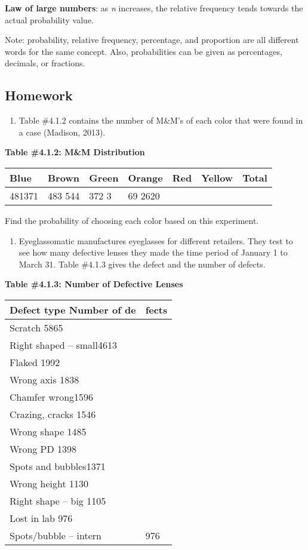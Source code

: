 \documentclass[]{book}
\providecommand{\tightlist}{%
  \setlength{\itemsep}{0pt}\setlength{\parskip}{0pt}}
\begin{document}
\textbf{Law of large numbers}: as \emph{n} increases, the relative frequency tends
towards the actual probability value.

Note: probability, relative frequency, percentage, and proportion are all different words for the same concept. Also, probabilities can be given as percentages, decimals, or fractions.

\hypertarget{homework-10}{%
\subsection{Homework}\label{homework-10}}

\begin{enumerate}
\def\labelenumi{\arabic{enumi}.}
\tightlist
\item
  Table \#4.1.2 contains the number of M\&M's of each color that were
  found in a case (Madison, 2013).
\end{enumerate}

\textbf{Table \#4.1.2: M\&M Distribution}

\begin{longtable}[]{@{}lllllll@{}}
\toprule
Blue & Brown & Green & Orange & Red & Yellow & Total\tabularnewline
\midrule
\endhead
481371 & 483 544 & 372 3 & 69 2620 & & &\tabularnewline
\bottomrule
\end{longtable}

Find the probability of choosing each color based on this experiment.

\begin{enumerate}
\def\labelenumi{\arabic{enumi}.}
\setcounter{enumi}{1}
\tightlist
\item
  Eyeglassomatic manufactures eyeglasses for different retailers. They
  test to see how many defective lenses they made the time period of
  January 1 to March 31. Table \#4.1.3 gives the defect and the number
  of defects.
\end{enumerate}

\textbf{Table \#4.1.3: Number of Defective Lenses}

\begin{longtable}[]{@{}ll@{}}
\toprule
Defect type Number of de & fects\tabularnewline
\midrule
\endhead
Scratch 5865 &\tabularnewline
Right shaped -- small4613 &\tabularnewline
Flaked 1992 &\tabularnewline
Wrong axis 1838 &\tabularnewline
Chamfer wrong1596 &\tabularnewline
Crazing, cracks 1546 &\tabularnewline
Wrong shape 1485 &\tabularnewline
Wrong PD 1398 &\tabularnewline
Spots and bubbles1371 &\tabularnewline
Wrong height 1130 &\tabularnewline
Right shape -- big 1105 &\tabularnewline
Lost in lab 976 &\tabularnewline
Spots/bubble -- intern & 976\tabularnewline
\bottomrule
\end{longtable}
\end{document}
